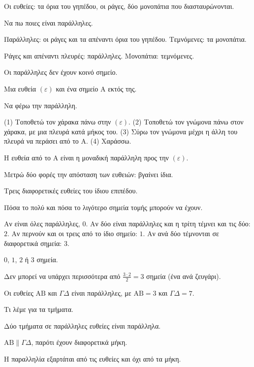 
\tixero Οι ευθείες: τα όρια του γηπέδου, οι ράγες, δύο μονοπάτια που διασταυρώνονται.\par
\tithelo Να πω ποιες είναι παράλληλες.\par
\possindeo Παράλληλες: οι ράγες και τα απέναντι όρια του γηπέδου. Τεμνόμενες: τα μονοπάτια.\par
\apantisi Ράγες και απέναντι πλευρές: παράλληλες. Μονοπάτια: τεμνόμενες.\par
\elegxos Οι παράλληλες δεν έχουν κοινό σημείο.

\tixero Μια ευθεία $(\varepsilon)$ και ένα σημείο $\mathrm{Α}$ εκτός της.\par
\tithelo Να φέρω την παράλληλη.\par
\possindeo (1) Τοποθετώ τον χάρακα πάνω στην $(\varepsilon)$. (2) Τοποθετώ τον γνώμονα πάνω στον χάρακα, με μια πλευρά κατά μήκος του. (3) Σύρω τον γνώμονα μέχρι η άλλη του πλευρά να περάσει από το $\mathrm{Α}$. (4) Χαράσσω.\par
\apantisi Η ευθεία από το $\mathrm{Α}$ είναι η μοναδική παράλληλη προς την $(\varepsilon)$.\par
\elegxos Μετρώ δύο φορές την απόσταση των ευθειών: βγαίνει ίδια.

\tixero Τρεις διαφορετικές ευθείες του ίδιου επιπέδου.\par
\tithelo Πόσα το πολύ και πόσα το λιγότερο σημεία τομής μπορούν να έχουν.\par
\possindeo Αν είναι όλες παράλληλες, $0$. Αν δύο είναι παράλληλες και η τρίτη τέμνει και τις δύο: $2$. Αν περνούν και οι τρεις από το ίδιο σημείο: $1$. Αν ανά δύο τέμνονται σε διαφορετικά σημεία: $3$.\par
\apantisi $0$, $1$, $2$ ή $3$ σημεία.\par
\elegxos Δεν μπορεί να υπάρχει περισσότερα από $\frac{3\cdot2}{2}=3$ σημεία (ένα ανά ζευγάρι).

\tixero Οι ευθείες $\mathrm{ΑΒ}$ και $\Gamma\Delta$ είναι παράλληλες, με $\mathrm{ΑΒ}=3$ και $\Gamma\Delta=7$.\par
\tithelo Τι λέμε για τα τμήματα.\par
\possindeo Δύο τμήματα σε παράλληλες ευθείες είναι παράλληλα.\par
\apantisi $\mathrm{ΑΒ}\parallel\Gamma\Delta$, παρότι έχουν διαφορετικά μήκη.\par
\elegxos Η παραλληλία εξαρτάται από τις ευθείες και όχι από τα μήκη.

